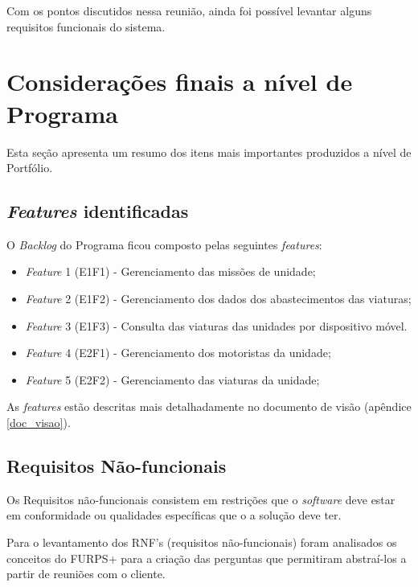       Com os pontos discutidos nessa reunião, ainda foi possível levantar alguns requisitos funcionais do sistema.
  
  \section{Considerações finais a nível de Programa}
    
    Esta seção apresenta um resumo dos itens mais importantes produzidos a nível de Portfólio.
    
    \subsection{\textit{Features} identificadas}
      
      O \textit{Backlog} do Programa ficou composto pelas seguintes \textit{features}:
      
      \begin{itemize}
       \item \textit{Feature} 1 (E1F1) - Gerenciamento das missões de unidade;
       \item \textit{Feature} 2 (E1F2) - Gerenciamento dos dados dos abastecimentos das viaturas;
       \item \textit{Feature} 3 (E1F3) - Consulta das viaturas das unidades por dispositivo móvel. 
       \item \textit{Feature} 4 (E2F1) - Gerenciamento dos motoristas da unidade;
       \item \textit{Feature} 5 (E2F2) - Gerenciamento das viaturas da unidade;
      \end{itemize}
      
      As \textit{features} estão descritas mais detalhadamente no documento de visão (apêndice \ref{doc_visao}).
              
    \subsection{Requisitos Não-funcionais}
    
          Os Requisitos não-funcionais consistem em restrições que o \textit{software} deve estar em conformidade ou qualidades específicas
          que o a solução deve ter. \cite{leffingwell14}
      
	  Para o levantamento dos RNF's (requisitos não-funcionais) foram analisados os conceitos do FURPS+ para a criação das perguntas que permitiram abstraí-los 
	  a partir de reuniões com o cliente.
	  
